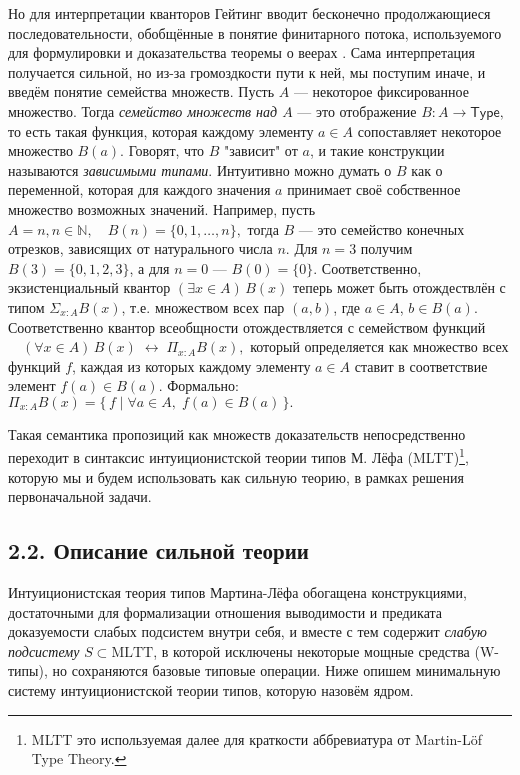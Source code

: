 \documentclass[14pt]{extarticle}
\begin{document}
	Но для интерпретации кванторов Гейтинг вводит бесконечно продолжающиеся последовательности, обобщённые в понятие финитарного потока, используемого для формулировки и доказательства теоремы о веерах \cite[128]{heyting1965intuitionism}. Сама интерпретация получается сильной, но из-за громоздкости пути к ней, мы поступим иначе, и введём понятие семейства множеств. Пусть \(A\) — некоторое фиксированное множество. Тогда \emph{семейство множеств над \(A\)} — это отображение
	\(
	B : A \longrightarrow \mathsf{Type},
	\)
	то есть такая функция, которая каждому элементу \(a\in A\) сопоставляет некоторое множество \(B(a)\). Говорят, что \(B\) "зависит" от \(a\), и такие конструкции называются \emph{зависимыми типами}.
	Интуитивно можно думать о \(B\) как о переменной, которая для каждого значения \(a\) принимает своё собственное множество возможных значений. Например, пусть
	\(
	A = n, n \in \mathbb{N}, \quad
	B(n) = \{0, 1, \dots, n\},
	\)
	тогда \(B\) — это семейство конечных отрезков, зависящих от натурального числа \(n\). Для \(n = 3\) получим \(B(3) = \{0,1,2,3\}\), а для \(n = 0\) — \(B(0) = \{0\}\).	 Соответственно, экзистенциальный квантор  \((\exists x \in A)\,B(x)\) теперь может быть отождествлён с типом \(\Sigma_{x:A}B(x)\), т.е. множеством всех пар \((a, b)\), где \(a\in A\), \(b\in B(a)\). Соответственно квантор всеобщности отождествляется с семейством функций 
	\(
	\quad (\forall x\in A)\,B(x)\;\longleftrightarrow\;\Pi_{x\!:\!A}B(x),
	\)
	который определяется как множество всех функций \(f\), каждая из которых каждому элементу \(a\in A\) ставит в соответствие элемент \(f(a)\in B(a)\).
	\newline Формально:
	\(
	\Pi_{x:A}B(x)=\{\,f \mid \forall a\in A,\;f(a)\in B(a)\,\}.
	\)
	
	Такая семантика пропозиций как множеств доказательств непосредственно переходит в синтаксис интуиционистской теории типов М. Лёфа \cite{martinlof1984intuitionistic} (MLTT)\footnote{MLTT это используемая далее для краткости аббревиатура от Martin-Löf Type Theory.}, которую мы и будем использовать как сильную теорию, в рамках решения первоначальной задачи.	

	\subsection*{2.2. Описание сильной теории}
	Интуиционистская теория типов Мартина-Лёфа обогащена конструкциями, достаточными для формализации отношения выводимости и предиката доказуемости слабых подсистем внутри себя, и вместе с тем содержит {\it слабую подсистему} \(S\subset\mathrm{MLTT}\), в которой исключены некоторые мощные средства (W-типы), но сохраняются базовые типовые операции. Ниже опишем минимальную систему интуиционистской теории типов, которую назовём ядром.
	
\end{document}
